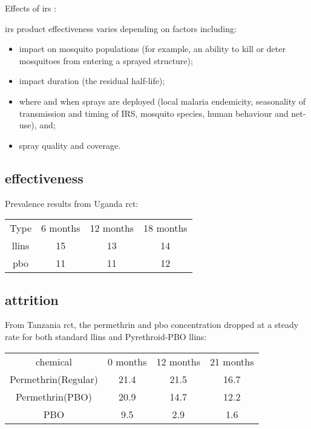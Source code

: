 \documentclass[a4paper, 12pt, twoside]{article}
\begin{document}
Effects of \gls{irs} \cite{Sherrard-Smith2018b}:

\gls{irs} product effectiveness varies depending on factors including: 

\begin{itemize}
  \item impact on mosquito populations (for example, an ability to kill or deter mosquitoes from entering a sprayed structure); 
  \item impact duration (the residual half-life); 
  \item where and when sprays are deployed (local malaria endemicity, seasonality of transmission and timing of IRS, mosquito species, human behaviour and net-use), and; 
  \item spray quality and coverage.
\end{itemize}

\subsection{effectiveness}

Prevalence results from Uganda \gls{rct}\cite{Staedke2020}:
\begin{center}
\begin{tabular}{ c c c c }
  Type & 6 months & 12 months & 18 months\\ 
  \gls{llins} & 15 & 13 & 14 \\  
  \gls{pbo} & 11 & 11 & 12\\
\end{tabular}
\end{center}

\subsection{attrition}
From Tanzania\cite{Protopopoff2018} \gls{rct}, the permethrin and \gls{pbo} concentration dropped at a steady rate for both standard \gls{llins} and Pyrethroid-PBO \gls{llins}:

\begin{center}
\begin{tabular}{ c c c c }
  chemical & 0 months & 12 months & 21 months\\ 
  Permethrin(Regular) & 21.4 & 21.5 & 16.7\\  
  Permethrin(PBO) & 20.9 & 14.7 & 12.2\\
  PBO & 9.5 & 2.9 & 1.6
\end{tabular}
\end{center}
\end{document}
